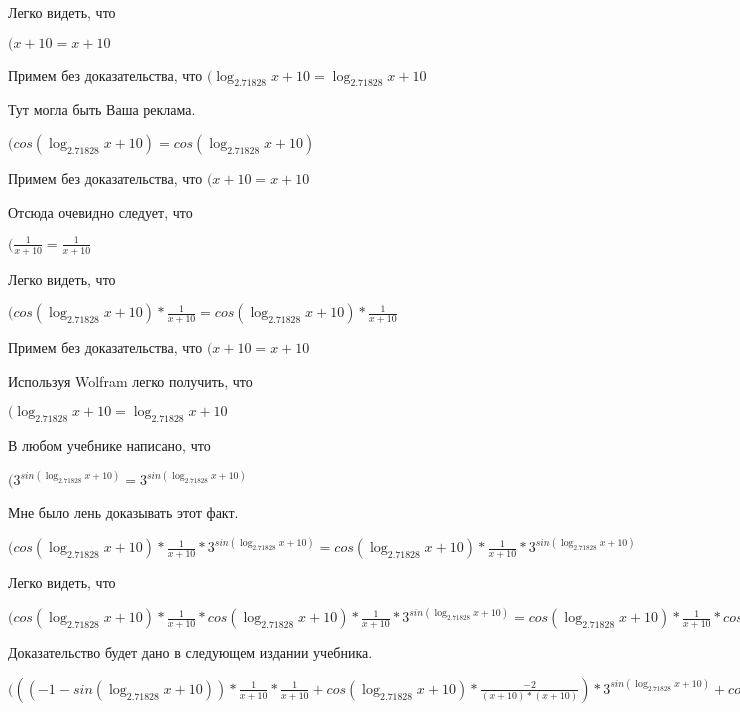 \documentclass[12pt,a4paper,fleqn]{article}
\theoremstyle{definition}
\begin{document}
Легко видеть, что

$( x  +  10  =  x  +  10 $

Примем без доказательства, что
$(\log_{ 2.71828 }{ x  +  10 } = \log_{ 2.71828 }{ x  +  10 }$

Тут могла быть Ваша реклама.

$(cos(\log_{ 2.71828 }{ x  +  10 }) = cos(\log_{ 2.71828 }{ x  +  10 })$

Примем без доказательства, что
$( x  +  10  =  x  +  10 $

Отсюда очевидно следует, что

$(\frac{ 1 }{ x  +  10 }
 = \frac{ 1 }{ x  +  10 }
$

Легко видеть, что

$(cos(\log_{ 2.71828 }{ x  +  10 }) * \frac{ 1 }{ x  +  10 }
 = cos(\log_{ 2.71828 }{ x  +  10 }) * \frac{ 1 }{ x  +  10 }
$

Примем без доказательства, что
$( x  +  10  =  x  +  10 $

Используя Wolfram легко получить, что

$(\log_{ 2.71828 }{ x  +  10 } = \log_{ 2.71828 }{ x  +  10 }$

В любом учебнике написано, что

$({ 3 }^{sin(\log_{ 2.71828 }{ x  +  10 })} = { 3 }^{sin(\log_{ 2.71828 }{ x  +  10 })}$

Мне было лень доказывать этот факт.

$(cos(\log_{ 2.71828 }{ x  +  10 }) * \frac{ 1 }{ x  +  10 }
 * { 3 }^{sin(\log_{ 2.71828 }{ x  +  10 })} = cos(\log_{ 2.71828 }{ x  +  10 }) * \frac{ 1 }{ x  +  10 }
 * { 3 }^{sin(\log_{ 2.71828 }{ x  +  10 })}$

Легко видеть, что

$(cos(\log_{ 2.71828 }{ x  +  10 }) * \frac{ 1 }{ x  +  10 }
 * cos(\log_{ 2.71828 }{ x  +  10 }) * \frac{ 1 }{ x  +  10 }
 * { 3 }^{sin(\log_{ 2.71828 }{ x  +  10 })} = cos(\log_{ 2.71828 }{ x  +  10 }) * \frac{ 1 }{ x  +  10 }
 * cos(\log_{ 2.71828 }{ x  +  10 }) * \frac{ 1 }{ x  +  10 }
 * { 3 }^{sin(\log_{ 2.71828 }{ x  +  10 })}$

Доказательство будет дано в следующем издании учебника.

$((( -1  - sin(\log_{ 2.71828 }{ x  +  10 })) * \frac{ 1 }{ x  +  10 }
 * \frac{ 1 }{ x  +  10 }
 + cos(\log_{ 2.71828 }{ x  +  10 }) * \frac{ -2 }{( x  +  10 ) * ( x  +  10 )}
) * { 3 }^{sin(\log_{ 2.71828 }{ x  +  10 })} + cos(\log_{ 2.71828 }{ x  +  10 }) * \frac{ 1 }{ x  +  10 }
 * cos(\log_{ 2.71828 }{ x  +  10 }) * \frac{ 1 }{ x  +  10 }
 * { 3 }^{sin(\log_{ 2.71828 }{ x  +  10 })} = (( -1  - sin(\log_{ 2.71828 }{ x  +  10 })) * \frac{ 1 }{ x  +  10 }
 * \frac{ 1 }{ x  +  10 }
 + cos(\log_{ 2.71828 }{ x  +  10 }) * \frac{ -2 }{( x  +  10 ) * ( x  +  10 )}
) * { 3 }^{sin(\log_{ 2.71828 }{ x  +  10 })} + cos(\log_{ 2.71828 }{ x  +  10 }) * \frac{ 1 }{ x  +  10 }
 * cos(\log_{ 2.71828 }{ x  +  10 }) * \frac{ 1 }{ x  +  10 }
 * { 3 }^{sin(\log_{ 2.71828 }{ x  +  10 })}$
\end{document}
